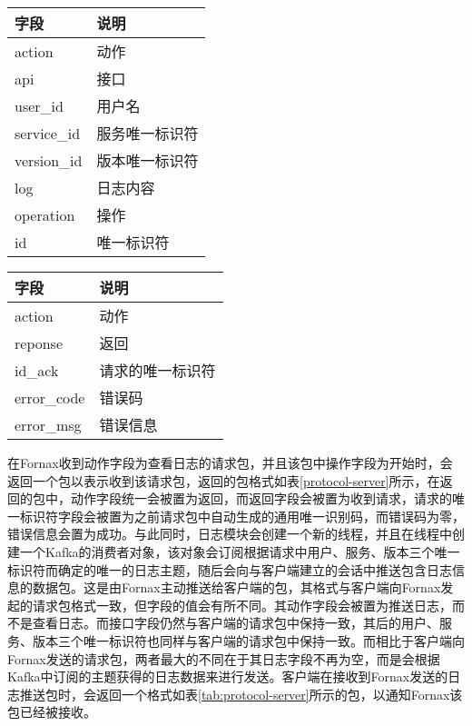 \begin{table}[!hpb]
  \centering
  \begin{tabular}{ll} \toprule
    字段 & 说明 \\ \midrule
    action & 动作 \\
    api & 接口 \\
    user\_id & 用户名 \\
    service\_id & 服务唯一标识符 \\
    version\_id & 版本唯一标识符 \\
    log & 日志内容 \\
    operation & 操作 \\
    id & 唯一标识符 \\ \bottomrule
  \end{tabular}
\end{table}

\begin{table}[!hpb]
  \centering
  \begin{tabular}{ll} \toprule
    字段 & 说明 \\ \midrule
    action & 动作 \\
    reponse & 返回 \\
    id\_ack & 请求的唯一标识符 \\
    error\_code & 错误码 \\
    error\_msg & 错误信息 \\ \bottomrule
  \end{tabular}
\end{table}

在Fornax收到动作字段为查看日志的请求包，并且该包中操作字段为开始时，会返回一个包以表示收到该请求包，返回的包格式如表\ref{protocol-server}所示，在返回的包中，动作字段统一会被置为返回，而返回字段会被置为收到请求，请求的唯一标识符字段会被置为之前请求包中自动生成的通用唯一识别码，而错误码为零，错误信息会置为成功。与此同时，日志模块会创建一个新的线程，并且在线程中创建一个Kafka的消费者对象，该对象会订阅根据请求中用户、服务、版本三个唯一标识符而确定的唯一的日志主题，随后会向与客户端建立的会话中推送包含日志信息的数据包。这是由Fornax主动推送给客户端的包，其格式与客户端向Fornax发起的请求包格式一致，但字段的值会有所不同。其动作字段会被置为推送日志，而不是查看日志。而接口字段仍然与客户端的请求包中保持一致，其后的用户、服务、版本三个唯一标识符也同样与客户端的请求包中保持一致。而相比于客户端向Fornax发送的请求包，两者最大的不同在于其日志字段不再为空，而是会根据Kafka中订阅的主题获得的日志数据来进行发送。客户端在接收到Fornax发送的日志推送包时，会返回一个格式如表\ref{tab:protocol-server}所示的包，以通知Fornax该包已经被接收。

